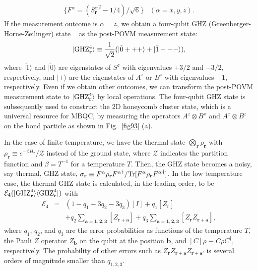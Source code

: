 \begin{eqnarray}
\{ F^{\alpha}= ({S_{\mathbf{r}} ^\alpha} ^2 - 1/4)/\sqrt{6} \} \;\;\; (\alpha =x,y,z).
\end{eqnarray}
If the measurement outcome is $\alpha =z$, we obtain a four-qubit GHZ (Greenberger-Horne-Zeilinger) state
~\cite{GHZ} as the post-POVM measurement state: 
\begin{eqnarray*}
|{\rm GHZ} ^4_{\mathbf{r}} \rangle  \equiv \frac{1}{\sqrt{2}} (|\tilde 0 +++\rangle + |\tilde 1 ---\rangle) ,
\end{eqnarray*}
where $|\tilde 1 \rangle  $ and $|\tilde 0 \rangle $ are eigenstates of $S^z$ with eigenvalues $+3/2$ and $-3/2$, respectively, and $|\pm\rangle$ are the eigenstates of $A^{z}$ or $B^{z}$ with eigenvalues $\pm 1$, respectively.
Even if we obtain other outcomes, we can transform the post-POVM measurement state to $|{\rm GHZ} ^4_{\mathbf{r}}\rangle$ by local operations.
The four-qubit GHZ state is subsequently used to construct the 2D honeycomb cluster state, which is a universal resource for MBQC, by measuring the operators $A^z \otimes B^x$ and $A^x \otimes B^z$ on the bond particle
as shown in Fig.~\ref{fig93} (a).

In the case of finite temperature, we have the thermal state $\bigotimes _{\mathbf{r}} \rho _{\mathbf{r}}$ with 
$\rho _{\mathbf{r}} \equiv e^{ - \beta  H_{\mathbf{r}} } /\mathcal{Z} $ instead of the ground state, where $\mathcal{Z}$ indicates the partition function and $\beta = T ^{-1}$ for a temperature $T$.  
Then, the GHZ state becomes a noisy, say thermal, GHZ state, 
$\sigma _{\mathbf{r}} \equiv F^{\alpha } \rho _{\mathbf{r}} {  F^{\alpha}} ^{\dag}/{\rm Tr}[ F^{\alpha } \rho _{\mathbf{r}}{  F^{\alpha}} ^{\dag}]$.
In the low temperature case, the thermal GHZ state 
is calculated, in the leading order, to be
 $\mathcal{E}_4 (|{\rm GHZ} ^4_{\mathbf{r}} \rangle  \langle {\rm GHZ} ^4_{\mathbf{r}}| )$ with 
\begin{eqnarray}
\mathcal{E}_4 &=& (1- q_1 - 3q_2 - 3q_3 ) [I] + q_1 [Z_{\mathbf{r}}  ]
\nonumber \\&&
+q_2 \sum _{\mathbf{a}=\mathbf{1},\mathbf{2},\mathbf{3}} [Z_{\mathbf{r} + \mathbf{a}}] 
+q_3 \sum _{\mathbf{a}=\mathbf{1},\mathbf{2},\mathbf{3}} [Z_{\mathbf{r} }Z_{\mathbf{r} + \mathbf{a}}] ,
\label{error}
\end{eqnarray}
where $q_1$, $q_2$, and $q_3$ are the error probabilities as functions of the temperature $T$, the Pauli $Z$ operator $Z_{\mathbf{b}}$ on the qubit at the position $\mathbf{b}$, and $[C]\rho \equiv C \rho C^{\dag}$, respectively.
The probability of other errors such as $Z_{\mathbf{r}} Z_{\mathbf{r} +\mathbf{a}} Z_{\mathbf{r} +\mathbf{a} '}$ is several orders of magnitude smaller than $q_{1,2,3}$.

